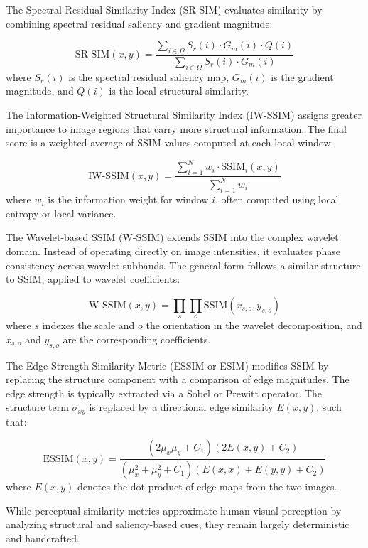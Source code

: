 The Spectral Residual Similarity Index (SR-SIM) evaluates similarity by combining spectral residual saliency and gradient magnitude:

\begin{equation}
\text{SR-SIM}(x, y) = \frac{\sum_{i \in \Omega} S_r(i) \cdot G_m(i) \cdot Q(i)}{\sum_{i \in \Omega} S_r(i) \cdot G_m(i)}
\end{equation}
where $S_r(i)$ is the spectral residual saliency map, $G_m(i)$ is the gradient magnitude, and $Q(i)$ is the local structural similarity.

The Information-Weighted Structural Similarity Index (IW-SSIM) assigns greater importance to image regions that carry more structural information. The final score is a weighted average of SSIM values computed at each local window:

\begin{equation}
\text{IW-SSIM}(x, y) = \frac{\sum_{i=1}^{N} w_i \cdot \text{SSIM}_i(x, y)}{\sum_{i=1}^{N} w_i}
\end{equation}
where $w_i$ is the information weight for window $i$, often computed using local entropy or local variance.

The Wavelet-based SSIM (W-SSIM) extends SSIM into the complex wavelet domain. Instead of operating directly on image intensities, it evaluates phase consistency across wavelet subbands. The general form follows a similar structure to SSIM, applied to wavelet coefficients:

\begin{equation}
\text{W-SSIM}(x, y) = \prod_{s} \prod_{o} \text{SSIM}(x_{s,o}, y_{s,o})
\end{equation}
where $s$ indexes the scale and $o$ the orientation in the wavelet decomposition, and $x_{s,o}$ and $y_{s,o}$ are the corresponding coefficients.

The Edge Strength Similarity Metric (ESSIM or ESIM) modifies SSIM by replacing the structure component with a comparison of edge magnitudes. The edge strength is typically extracted via a Sobel or Prewitt operator. The structure term $\sigma_{xy}$ is replaced by a directional edge similarity $E(x, y)$, such that:

\begin{equation}
\text{ESSIM}(x, y) = \frac{(2\mu_x \mu_y + C_1)(2E(x, y) + C_2)}{(\mu_x^2 + \mu_y^2 + C_1)(E(x, x) + E(y, y) + C_2)}
\end{equation}
where $E(x, y)$ denotes the dot product of edge maps from the two images.

While perceptual similarity metrics approximate human visual perception by analyzing structural and saliency-based cues, they remain largely deterministic and handcrafted.

